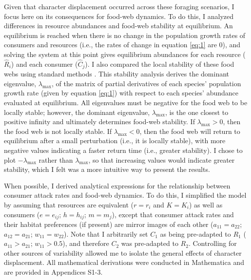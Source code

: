 \documentclass[11pt,]{article}
\begin{document}
Given that character displacement occurred across these foraging
scenarios, I focus here on its consequences for food-web dynamics. To do
this, I analyzed differences in resource abundances and food-web
stability at equilibrium. An equilibrium is reached when there is no
change in the population growth rates of consumers and resources (i.e.,
the rates of change in equation \ref{eq:1} are 0), and solving the
system at this point gives equilibrium abundances for each resource
(\(\hat R_i\)) and each consumer (\(\hat C_j\)). I also compared the
local stability of these food webs using standard methods
\citep{Otto2007}. This stability analysis derives the dominant
eigenvalue, \(\lambda_{\text{max}}\), of the matrix of partial
derivatives of each species' population growth rate (given by equation
\ref{eq:1}) with respect to each species' abundance evaluated at
equilibrium. All eigenvalues must be negative for the food web to be
locally stable; however, the dominant eigenvalue,
\(\lambda_{\text{max}}\), is the one closest to positive infinity and
ultimately determines food-web stability. If \(\lambda_{\text{max}}>0\),
then the food web is not locally stable. If \(\lambda_{\text{max}}<0\),
then the food web will return to equilibrium after a small perturbation
(i.e., it is locally stable), with more negative values indicating a
faster return time (i.e., greater stability). I chose to plot
\(-\lambda_{\text{max}}\) rather than \(\lambda_{\text{max}}\), so that
increasing values would indicate greater stability, which I felt was a
more intuitive way to present the results.

When possible, I derived analytical expressions for the relationship
between consumer attack rates and food-web dynamics. To do this, I
simplified the model by assuming that resources are equivalent
(\(r=r_i\) and \(K=K_i\)) as well as consumers (\(e=e_{ij}\);
\(h=h_{ij}\); \(m=m_j\)), except that consumer attack rates and their
habitat preferences (if present) are mirror images of each other
(\(a_{11}=a_{22}\); \(a_{12}=a_{21}\); \(w_{11}=w_{22}\)). Note that I
arbitrarily set \(C_1\) as being pre-adapted to \(R_1\)
(\(a_{11} > a_{21}\); \(w_{11} > 0.5\)), and therefore \(C_2\) was
pre-adapted to \(R_2\). Controlling for other sources of variability
allowed me to isolate the general effects of character displacement. All
mathematical derivations were conducted in Mathematica
\citep{Mathematica} and are provided in Appendices S1-3.
\end{document}
